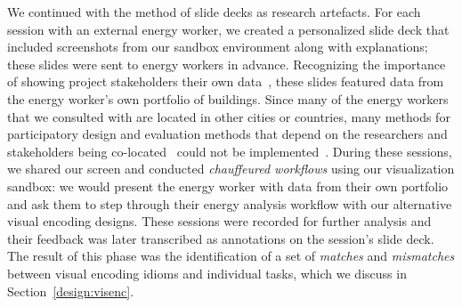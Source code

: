 \documentclass[journal]{vgtc}                %
\newcommand{\bstart}[1]{\vspace{1mm} \noindent{\textbf{#1:}}}
\newcommand{\tm}[1]{\textcolor{red}{#1}}
\begin{document}
We continued with the method of slide decks as research artefacts. 
For each session with an external energy worker, we created a personalized slide deck that included screenshots from our sandbox environment along with explanations; these slides were sent to energy workers in advance.
Recognizing the importance of showing project stakeholders their own data~\cite{Lloyd2011}, these slides featured data from the energy worker's own portfolio of buildings.
Since many of the energy workers that we consulted with are located in other cities or countries, many methods for participatory design and evaluation methods that depend on the researchers and stakeholders being co-located~\cite{Goodwin2013,McKenna2014} could not be implemented~\cite{Brehmer2014a}.
During these sessions, we shared our screen and conducted {\it chauffeured workflows} using our visualization sandbox: we would present the energy worker with data from their own portfolio and ask them to step through their energy analysis workflow with our alternative visual encoding designs.
These sessions were recorded for further analysis and their feedback was later transcribed as annotations on the session's slide deck.
The result of this phase was the identification of a set of {\it matches} and {\it mismatches} between visual encoding idioms and individual tasks, which we discuss in Section~\ref{design:visenc}. 

\end{document}

